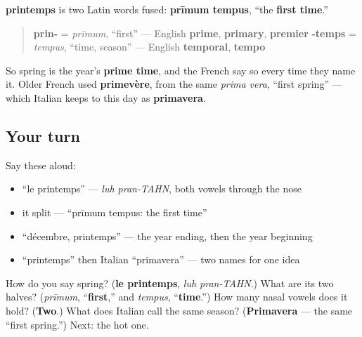 \begin{cousinweb}
\textbf{printemps} is two Latin words fused: \textbf{prīmum tempus}, \textquotedblleft{}the \textbf{first time}.\textquotedblright{}

\begin{quote}
\textbf{prin-} = \emph{prīmum}, \textquotedblleft{}first\textquotedblright{} — English \textbf{prime}, \textbf{primary}, \textbf{premier} \textbf{-temps} = \emph{tempus}, \textquotedblleft{}time, season\textquotedblright{} — English \textbf{temporal}, \textbf{tempo}
\end{quote}

So spring is the year's \textbf{prime time}, and the French say so every time they name it. Older French used \textbf{primevère}, from the same \emph{prima vera}, \textquotedblleft{}first spring\textquotedblright{} — which Italian keeps to this day as \textbf{primavera}.
\end{cousinweb}

\subsection*{Your turn}
Say these aloud:

\begin{itemize}
\raggedright
  \item \textquotedblleft{}le printemps\textquotedblright{} — \emph{luh pran-TAHN}, both vowels through the nose
  \item it split — \textquotedblleft{}prīmum tempus: the first time\textquotedblright{}
  \item \textquotedblleft{}décembre, printemps\textquotedblright{} — the year ending, then the year beginning
  \item \textquotedblleft{}printemps\textquotedblright{} then Italian \textquotedblleft{}primavera\textquotedblright{} — two names for one idea
\end{itemize}

\begin{tcolorbox}[breakable,colback=teal!4,colframe=teal!35!black,title={Before you move on}]
How do you say spring? (\textbf{le printemps}, \emph{luh pran-TAHN}.) What are its two halves? (\emph{prīmum}, \textquotedblleft{}\textbf{first},\textquotedblright{} and \emph{tempus}, \textquotedblleft{}\textbf{time}.\textquotedblright{}) How many nasal vowels does it hold? (\textbf{Two}.) What does Italian call the same season? (\textbf{Primavera} — the same \textquotedblleft{}first spring.\textquotedblright{}) Next: the hot one.
\end{tcolorbox}

